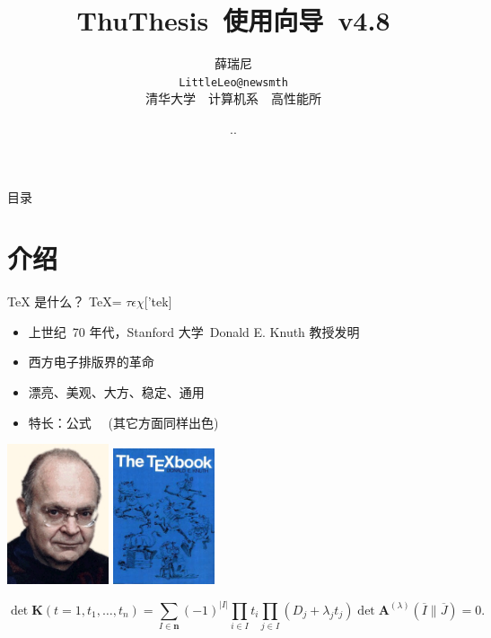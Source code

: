 \documentclass[dvipsnames, svgnames,
               mode=present, paper=screen,
               size=9pt, style=husky]{powerdot}
\let\fs=\fangsong
\let\hei=\heiti
\let\li=\lishu
\newcommand{\envert}[1]{\left\lvert#1\right\rvert}
\begin{document}
\def\version{v4.8}
\title{\hei\Huge ThuThesis~使用向导~\version}
\author{\fs 薛瑞尼\\[5pt]\texttt{LittleLeo@newsmth}\\[10pt]\li 清华大学~~计算机系~~高性能所}
\date{\the\year.\the\month.\the\day}
\maketitle

\begin{slide}[toc=, bm=]{目录}
\tableofcontents[type=1, content=sections]
\end{slide}

\section{介绍}

\begin{slide}[]{\TeX{} 是什么？}
\TeX = $\tau\epsilon\chi$['tek]
\begin{itemize}
  \item 上世纪~70 年代，Stanford 大学~Donald E. Knuth 教授发明
  \item 西方电子排版界的革命
  \item 漂亮、美观、大方、稳定、通用
  \item 特长：公式~~ (其它方面同样出色)
\end{itemize}
\medskip

\centering
\includegraphics[width=3cm]{knuth.jpg}\hspace{2cm}%
\includegraphics[width=3cm]{texbook.jpg}

\begin{equation}
\det\mathbf{K}(t=1,t_1,\dots,t_n) = \sum_{I\in\mathbf{n}}(-1)^{\envert{I}}
\prod_{i\in I}t_{i} \prod_{j\in I}(D_{j}+\lambda_{j}t_{j})
\det\mathbf{A}^{(\lambda)}(\overline{I}\|\overline{J})=0.
\end{equation} 
\end{slide}
\end{document}
